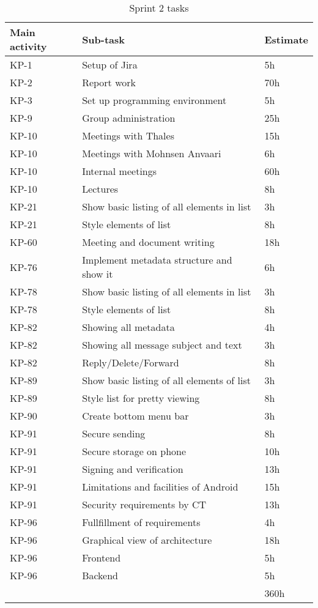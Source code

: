 \begin{table}
\begin{tabularx}{\linewidth}{>{\setlength\hsize{.2\hsize}}X|>{\setlength\hsize{1.5\hsize}}X|>{\setlength\hsize{.1\hsize}}X}
\textbf{Main activity} &  \textbf{Sub-task} & \textbf{Estimate}\\ \hline \hline
KP-1 & Setup of Jira & 5h\\ \hline
KP-2 & Report work & 70h\\ \hline
KP-3 & Set up programming environment & 5h \\ \hline
KP-9 & Group administration & 25h\\ \hline
KP-10 & Meetings with Thales & 15h\\ \hline
KP-10 & Meetings with Mohnsen Anvaari & 6h\\ \hline
KP-10 & Internal meetings & 60h\\ \hline
KP-10 & Lectures & 8h\\ \hline
KP-21 & Show basic listing of all elements in list & 3h \\ \hline
KP-21 & Style elements of list & 8h \\ \hline
KP-60 & Meeting and document writing & 18h \\ \hline
KP-76 & Implement metadata structure and show it & 6h \\ \hline
KP-78 & Show basic listing of all elements in list & 3h \\ \hline
KP-78 & Style elements of list & 8h \\ \hline
KP-82 & Showing all metadata & 4h \\ \hline
KP-82 & Showing all message subject and text & 3h \\ \hline
KP-82 & Reply/Delete/Forward & 8h \\ \hline
KP-89 & Show basic listing of all elements of list & 3h \\ \hline
KP-89 & Style list for pretty viewing & 8h \\ \hline
KP-90 & Create bottom menu bar & 3h \\ \hline
KP-91 & Secure sending & 8h \\ \hline
KP-91 & Secure storage on phone & 10h \\ \hline
KP-91 & Signing and verification & 13h \\ \hline
KP-91 & Limitations and facilities of Android & 15h \\ \hline
KP-91 & Security requirements by CT & 13h \\ \hline
KP-96 & Fullfillment of requirements & 4h \\ \hline
KP-96 & Graphical view of architecture & 18h \\ \hline
KP-96 & Frontend & 5h \\ \hline
KP-96 & Backend & 5h \\ \hline
 &  & 360h
\end{tabularx}
\caption{Sprint 2 tasks} \label{tab:sprint2tasks}
\end{table}